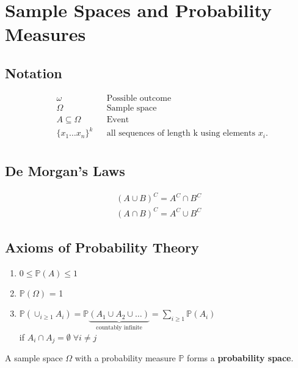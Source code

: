\section{Sample Spaces and Probability Measures}
\subsection{Notation}
\noindent\begin{align*}
     & \omega               &  & \text{Possible outcome}                               \\
     & \Omega               &  & \text{Sample space}                                   \\
     & A \subseteq \Omega   &  & \text{Event}                                          \\
     & \{x_1 \dots x_n \}^k &  & \text{all sequences of length k using elements } x_i. \\
\end{align*}
\subsection{De Morgan's Laws}
\noindent\begin{align*}
    {(A\cup B)}^C = A^C\cap B^C \\
    {(A\cap B)}^C = A^C\cup B^C
\end{align*}

\subsection{Axioms of Probability Theory}
\begin{enumerate}
    \item $0\leq \mathbb{P}(A)\leq 1$
    \item $\mathbb{P}(\Omega)$ = 1
    \item $\mathbb{P}\left(\cup_{i\geq 1} A_i\right) = \mathbb{P}\underbrace{(A_1 \cup A_2 \cup \dots)}_{\text{countably infinite}} = \sum_{i\geq 1} \mathbb{P}(A_i)$\\
          if $A_{i} \cap A_{j} = \emptyset \; \forall i \ne j$
\end{enumerate}
A sample space $\Omega$ with a probability measure $\mathbb{P}$ forms a \textbf{probability space}.

